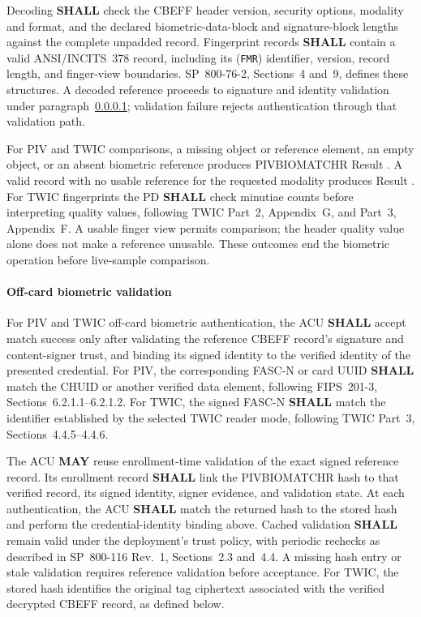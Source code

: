 Decoding \textbf{SHALL} check the CBEFF header version, security options, modality and format,
and the declared biometric-data-block and signature-block lengths against the
complete unpadded record. Fingerprint records \textbf{SHALL} contain a valid
ANSI/INCITS~378 record, including its  (\texttt{FMR})
identifier, version, record length, and finger-view boundaries. SP~800-76-2,
Sections~4 and~9, defines these structures. A decoded reference proceeds to
signature and identity validation under paragraph~\ref{sec:biometric-validation};
validation failure rejects authentication through that validation path.

For PIV and TWIC comparisons, a missing object or reference element, an empty
object, or an absent biometric reference produces PIVBIOMATCHR Result
. A valid record with no usable reference for the requested modality
produces Result . For TWIC fingerprints the PD \textbf{SHALL} check
minutiae counts before interpreting quality values, following TWIC Part~2,
Appendix~G, and Part~3, Appendix~F. A usable finger view permits comparison;
the header quality value  alone does not make a reference unusable.
These outcomes end the biometric operation before live-sample comparison.

\paragraph{Off-card biometric validation}\label{sec:biometric-validation}
For PIV and TWIC off-card biometric authentication, the ACU \textbf{SHALL} accept
match success only after validating the reference CBEFF record's signature and
content-signer trust, and binding its signed identity to the verified identity of
the presented credential. For PIV, the corresponding FASC-N or card UUID
\textbf{SHALL} match the CHUID or another verified data element, following
FIPS~201-3, Sections~6.2.1.1--6.2.1.2. For TWIC, the signed FASC-N
\textbf{SHALL} match the identifier established by the selected TWIC reader mode,
following TWIC Part~3, Sections~4.4.5--4.4.6.

The ACU \textbf{MAY} reuse enrollment-time validation of the exact signed
reference record. Its enrollment record \textbf{SHALL} link the PIVBIOMATCHR
hash to that verified record, its signed identity, signer evidence, and validation state.
At each authentication, the ACU \textbf{SHALL} match the returned hash to the
stored hash and perform the credential-identity binding above. Cached validation
\textbf{SHALL} remain valid under the deployment's trust policy, with periodic
rechecks as described in SP~800-116 Rev.~1, Sections~2.3 and~4.4. A missing hash
entry or stale validation requires reference validation before acceptance.
For TWIC, the stored hash identifies the original tag  ciphertext
associated with the verified decrypted CBEFF record, as defined below.

